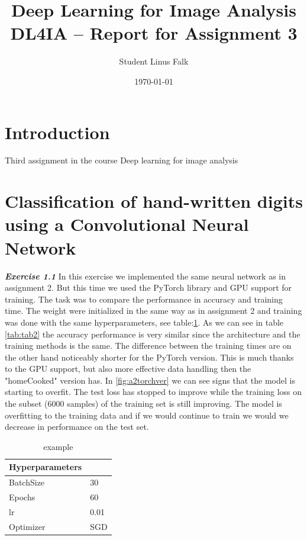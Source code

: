 \documentclass[a4paper,10pt]{article}
\title{\textbf{Deep Learning for Image Analysis} 
\\ DL4IA -- Report for Assignment 3}
\author{Student Linus Falk}
\date{\today}
\begin{document}
\lstset{language=Python}
\maketitle

\section*{Introduction}
Third assignment in the course Deep learning for image analysis

\section{Classification of hand-written digits using a Convolutional
Neural Network}

\textit{\textbf{Exercise 1.1}}
In this exercise we implemented the same neural network as in assignment 2. But this time we used the PyTorch library and GPU support for training. The task was to compare the performance in accuracy and training time. The weight were initialized in the same way as in assignment 2 and training was done with the same hyperparameters, see table:\ref{tab:tab1}. As we can see in table \ref{tab:tab2} the accuracy performance is very similar since the architecture and the training methods is the same. The difference between the training times are on the other hand noticeably shorter for the PyTorch version. This is much thanks to the GPU support, but also more effective data handling then the "homeCooked" version has. In \ref{fig:a2torchver} we can see signs that the model is starting to overfit. The test loss has stopped to improve while the training loss on the subset (6000 samples) of the training set is still improving. The model is overfitting to the training data and if we would continue to train we would we decrease in performance on the test set. 

\begin{table}[ht!]
\centering
\begin{tabular}{ll}\hline
 \textbf{Hyperparameters}&    \\ \hline
 BatchSize&  30  \\
 Epochs&  60 \\ 
 lr& 0.01\\
Optimizer& SGD  \\\hline
\end{tabular}
\caption{example}
\label{tab:tab1}
\end{table}
\end{document}
